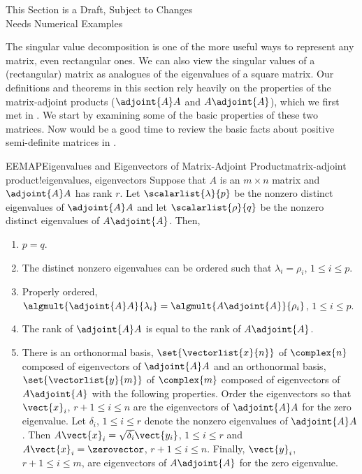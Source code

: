 %
{\sc\large This Section is a Draft, Subject to Changes}\\
{\sc\large Needs Numerical Examples}\par\bigskip
%
The singular value decomposition is one of the more useful ways to represent any matrix, even rectangular ones.  We can also view the singular values of a (rectangular) matrix as analogues of the eigenvalues of a square matrix.  Our definitions and theorems in this section rely heavily on the properties of the matrix-adjoint products ($\adjoint{A}A$ and $A\adjoint{A}$), which we first met in .  We start by examining some of the basic properties of these two matrices.  Now would be a good time to review the basic facts about positive semi-definite matrices in .
%
%
%
\begin{theorem}{EEMAP}{Eigenvalues and Eigenvectors of Matrix-Adjoint Product}{matrix-adjoint product!eigenvalues, eigenvectors}
Suppose that $A$ is an $m\times n$ matrix and $\adjoint{A}A$ has rank $r$.  Let $\scalarlist{\lambda}{p}$ be the nonzero distinct eigenvalues of $\adjoint{A}A$ and let $\scalarlist{\rho}{q}$ be the nonzero distinct eigenvalues of $A\adjoint{A}$.  Then,
%
\begin{enumerate}
\item $p=q$.
\item The distinct nonzero eigenvalues can be ordered such that $\lambda_i=\rho_i$, $1\leq i\leq p$.
\item Properly ordered, $\algmult{\adjoint{A}A}{\lambda_i}=\algmult{A\adjoint{A}}{\rho_i}$, $1\leq i\leq p$.
\item The rank of $\adjoint{A}A$ is equal to the rank of $A\adjoint{A}$.
\item There is an orthonormal basis, $\set{\vectorlist{x}{n}}$ of $\complex{n}$ composed of eigenvectors of $\adjoint{A}A$ and an orthonormal basis, $\set{\vectorlist{y}{m}}$ of $\complex{m}$ composed of eigenvectors of $A\adjoint{A}$ with the following properties.  Order the eigenvectors so that $\vect{x}_i$, $r+1\leq i\leq n$ are the eigenvectors of $\adjoint{A}A$ for the zero eigenvalue.  Let $\delta_i$, $1\leq i\leq r$ denote the nonzero eigenvalues of $\adjoint{A}A$.  Then $A\vect{x}_i=\sqrt{\delta_i}\vect{y_i}$, $1\leq i\leq r$ and $A\vect{x}_i=\zerovector$, $r+1\leq i\leq n$.  Finally, $\vect{y}_i$, $r+1\leq i\leq m$, are eigenvectors of $A\adjoint{A}$ for the zero eigenvalue.
\end{enumerate}
%
\end{theorem}
